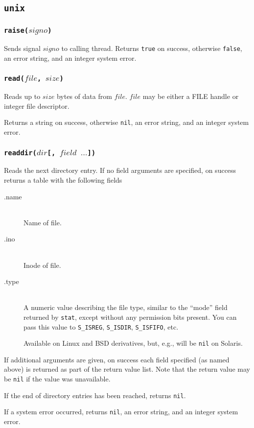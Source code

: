 \documentclass[11pt, oneside]{memoir}
\newcommand*{\true}[0]{\texttt{true}\xspace}
\newcommand*{\false}[0]{\texttt{false}\xspace}
\newcommand*{\nil}[0]{\texttt{nil}\xspace}
\newcommand*{\syscall}[1]{\texttt{#1}\xspace}
\newcommand*{\fn}[1]{\texttt{#1}\xspace}
\newcommand*{\otherwise}[1]{otherwise #1, an error string, and an integer system error}
\newcounter{toccols}
\newenvironment{Module}[1]{
	\subsection{\texttt{#1}}
	\addtocontents{toc}{
		\protect\begin{multicols}{\value{toccols}}
	}
}{
	\addtocontents{toc}{\protect\end{multicols}}
}
\begin{document}
\begin{Module}{unix}
\subsubsection[\fn{raise}]{\fn{raise($signo$)}}

Sends signal $signo$ to calling thread. Returns \true on success, otherwise \false, an error string, and an integer system error.

\subsubsection[\fn{read}]{\fn{read($file$, $size$)}}

Reads up to $size$ bytes of data from $file$. $file$ may be either a FILE handle or integer file descriptor.

Returns a string on success, \otherwise{\nil}.

\subsubsection[\fn{readdir}]{\fn{readdir($dir$[, $field$ $\ldots$])}}

Reads the next directory entry. If no field arguments are specified, on success returns a table with the following fields

\begin{description}
\item[.name] \hfill \\
Name of file.
\item[.ino] \hfill \\
Inode of file.
\item[.type] \hfill \\
A numeric value describing the file type, similar to the ``mode'' field returned by \syscall{stat}, except without any permission bits present. You can pass this value to \fn{S\_ISREG}, \fn{S\_ISDIR}, \fn{S\_ISFIFO}, etc.

Available on Linux and BSD derivatives, but, e.g., will be \nil on Solaris.
\end{description}

If additional arguments are given, on success each field specified (as named above) is returned as part of the return value list. Note that the return value may be \nil if the value was unavailable.

If the end of directory entries has been reached, returns \nil.

If a system error occurred, returns \nil, an error string, and an integer system error.


\end{Module}
\end{document}
